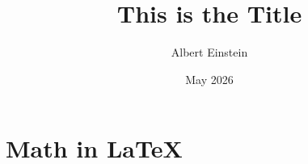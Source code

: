 \documentclass{article} %
\title{This is the Title}
\author{Albert Einstein}
\date{May 2026}
\begin{document}
\maketitle

\section{Math in LaTeX}
\end{document}

